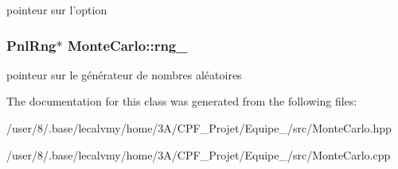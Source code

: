 pointeur sur l'option \hypertarget{classMonteCarlo_aa41318b565311457e04383047d68936e}{
\subsubsection[{rng\-\_\-}]{\setlength{\rightskip}{0pt plus 5cm}Pnl\-Rng$\ast$ Monte\-Carlo\-::rng\-\_\-}}\label{classMonteCarlo_aa41318b565311457e04383047d68936e}
pointeur sur le générateur de nombres aléatoires 

The documentation for this class was generated from the following files\-:\begin{DoxyCompactItemize}
\item 
/user/8/.\-base/lecalvmy/home/3\-A/\-C\-P\-F\-\_\-\-Projet/\-Equipe\-\_/src/Monte\-Carlo.\-hpp\item 
/user/8/.\-base/lecalvmy/home/3\-A/\-C\-P\-F\-\_\-\-Projet/\-Equipe\-\_/src/Monte\-Carlo.\-cpp\end{DoxyCompactItemize}
